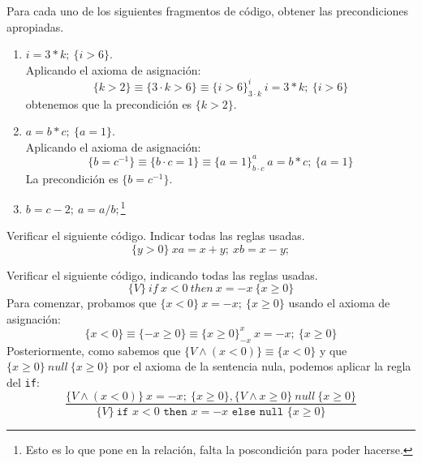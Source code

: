 \begin{ejercicio}
    Para cada uno de los siguientes fragmentos de código, obtener las precondiciones apropiadas.
    \begin{enumerate}
        \item $i=3\ast k;\ \{i>6\}$.\\
            Aplicando el axioma de asignación:
            \begin{equation*}
                \{k>2\} \equiv \{3\cdot k>6\} \equiv \{i>6\}^i_{3\cdot k}\ i=3\ast k;\ \{i>6\}
            \end{equation*}
            obtenemos que la precondición es $\{k>2\}$.
        \item $a=b\ast c;\ \{a=1\}$.\\
            Aplicando el axioma de asignación:
            \begin{equation*}
                \{b = c^{-1}\} \equiv \{b\cdot c = 1\} \equiv \{a=1\}^a_{b\cdot c}\ a=b\ast c;\ \{a=1\}
            \end{equation*}
        La precondición es $\{b=c^{-1}\}$.
        \item $b=c-2;\ a=a/b;$\footnote{Esto es lo que pone en la relación, falta la poscondición para poder hacerse.}
    \end{enumerate}
\end{ejercicio}

\begin{ejercicio}
    Verificar el siguiente código. Indicar todas las reglas usadas.
    \begin{equation*}
        \{y>0\}\ xa=x+y;\ xb=x-y;
    \end{equation*}
\end{ejercicio}

\begin{ejercicio}
    Verificar el siguiente código, indicando todas las reglas usadas.
    \begin{equation*}
        \{V\}\ if\ x < 0\ then\ x = -x\ \{x\geq 0\}
    \end{equation*}
    Para comenzar, probamos que $\{x<0\}\ x=-x;\ \{x\geq 0\}$ usando el axioma de asignación:
    \begin{equation*}
        \{x<0\} \equiv \{-x\geq 0\} \equiv \{x\geq 0\}^x_{-x}\ x=-x;\ \{x\geq 0\}
    \end{equation*}
    Posteriormente, como sabemos que $\{V \land (x<0)\}\equiv \{x<0\}$ y que ${\{x\geq 0\}\ null\ \{x\geq 0\}}$ por el axioma de la sentencia nula, podemos aplicar la regla del \texttt{if}:
    \begin{equation*}
        \dfrac{\{V \land (x<0)\}\ x=-x;\ \{x\geq 0\}, \{V \land x\geq 0\}\ null\ \{x\geq 0\}}{\{V\}\ \texttt{if\ }x<0 \texttt{\ then\ }x=-x \texttt{\ else\ null\ } \{x\geq 0\}}
    \end{equation*}
\end{ejercicio}

